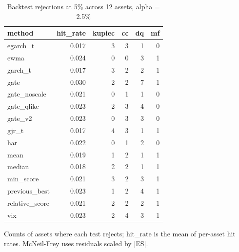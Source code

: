 \begin{table}[t]
\centering
\small
\caption{Backtest rejections at 5\% across 12 assets, alpha = 2.5\%}
\label{tab:backtests}
\begin{tabular}{lrrrrr}
\toprule
method & hit\_rate & kupiec & cc & dq & mf \\
\midrule
egarch\_t & 0.017 & 3 & 3 & 1 & 0 \\
ewma & 0.024 & 0 & 0 & 3 & 1 \\
garch\_t & 0.017 & 3 & 2 & 2 & 1 \\
gate & 0.030 & 2 & 2 & 7 & 1 \\
gate\_noscale & 0.021 & 0 & 1 & 1 & 0 \\
gate\_qlike & 0.023 & 2 & 3 & 4 & 0 \\
gate\_v2 & 0.023 & 0 & 3 & 3 & 0 \\
gjr\_t & 0.017 & 4 & 3 & 1 & 1 \\
har & 0.022 & 0 & 1 & 2 & 0 \\
mean & 0.019 & 1 & 2 & 1 & 1 \\
median & 0.018 & 2 & 2 & 1 & 1 \\
min\_score & 0.021 & 3 & 2 & 3 & 1 \\
previous\_best & 0.023 & 1 & 2 & 4 & 1 \\
relative\_score & 0.021 & 2 & 2 & 2 & 1 \\
vix & 0.023 & 2 & 4 & 3 & 1 \\
\bottomrule
\end{tabular}
\par\footnotesize Counts of assets where each test rejects; hit\_rate is the mean of per-asset hit rates. McNeil-Frey uses residuals scaled by |ES|.
\end{table}
